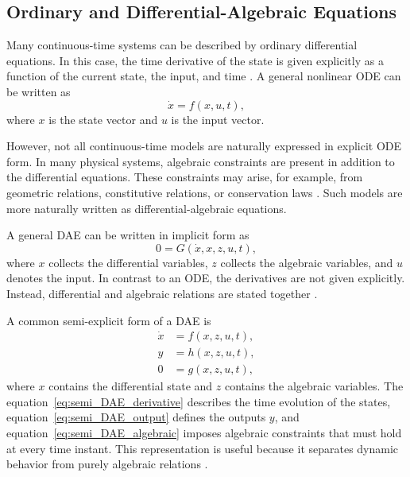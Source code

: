 \subsection{Ordinary and Differential-Algebraic Equations}
\label{sec:212_ode_dae}

Many continuous-time systems can be described by ordinary differential equations.
In this case, the time derivative of the state is given explicitly as a function of the current state, the input, and time \cite{kunkel_differential-algebraic_2024,css_cellier_kofman}.
A general nonlinear \ac{ODE} can be written as
\begin{equation}
    \dot{x} = f(x,u,t),
\end{equation}
where $x$ is the state vector and $u$ is the input vector.

However, not all continuous-time models are naturally expressed in explicit \ac{ODE} form.
In many physical systems, algebraic constraints are present in addition to the differential equations.
These constraints may arise, for example, from geometric relations, constitutive relations, or conservation laws \cite{css_cellier_kofman, karnopp_system_2012}.
Such models are more naturally written as differential-algebraic equations.

A general \ac{DAE} can be written in implicit form as
\begin{equation}
   0 = G(\dot{x}, x, z, u, t),
\end{equation}
where $x$ collects the differential variables, $z$ collects the algebraic variables, and $u$ denotes the input.
In contrast to an \ac{ODE}, the derivatives are not given explicitly.
Instead, differential and algebraic relations are stated together \cite{kunkel_differential-algebraic_2024}.

A common semi-explicit form of a DAE is
\begin{align}
    \dot{x} &= f(x,z,u,t),\label{eq:semi_DAE_derivative} \\
    y &= h(x, z, u, t),\label{eq:semi_DAE_output} \\
    0 &= g(x,z,u,t)\label{eq:semi_DAE_algebraic},
\end{align}
where $x$ contains the differential state and $z$ contains the algebraic variables.
The equation~\eqref{eq:semi_DAE_derivative} describes the time evolution of the states, equation~\eqref{eq:semi_DAE_output} defines the outputs $y$, and equation~\eqref{eq:semi_DAE_algebraic} imposes algebraic constraints that must hold at every time instant.
This representation is useful because it separates dynamic behavior from purely algebraic relations \cite{kunkel_differential-algebraic_2024,css_cellier_kofman}.

